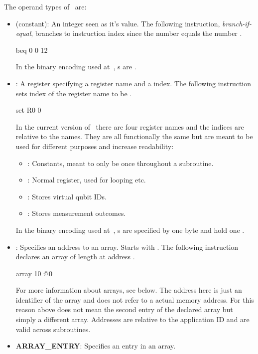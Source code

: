 The operand types of \netqasm\ are:
\begin{itemize}
  \item \IMMEDIATE (constant): An integer seen as it's value.
        The following instruction,  \emph{branch-if-equal}, branches to instruction index  since the number  equals the number .
        \begin{nqcode}
beq 0 0 12\end{nqcode}
        In the binary encoding used at~\cite{git_netqasm}, \IMMEDIATE{}s are .
  \item \REGISTER: A register specifying a register name and a index.
        The following instruction sets index  of the register name  to be .
        \begin{nqcode}
set R0 0\end{nqcode}
        In the current version of \netqasm\ there are four register names and the indices are relative to the names.
        They are all functionally the same but are meant to be used for different purposes and increase readability:
        \begin{itemize}
          \item {}: Constants, meant to only be  once throughout a subroutine.
          \item {}: Normal register, used for looping etc.
          \item {}: Stores virtual qubit IDs.
          \item {}: Stores measurement outcomes.
        \end{itemize}
        In the binary encoding used at~\cite{git_netqasm}, \REGISTER{}s are specified by one byte and hold one .
  \item \ADDRESS: Specifies an address to an array.
        Starts with .
        The following instruction declares an array of length  at address .
        \begin{nqcode}
array 10 @0\end{nqcode}
        For more information about arrays, see below.
        The address here is just an identifier of the array and does not refer to a actual memory address.
        For this reason  above does not mean the second entry of the declared array but simply a different array.
        Addresses are relative to the application ID and are valid across subroutines.
  \item \textbf{ARRAY\_ENTRY}: Specifies an entry in an array.

\end{itemize}
